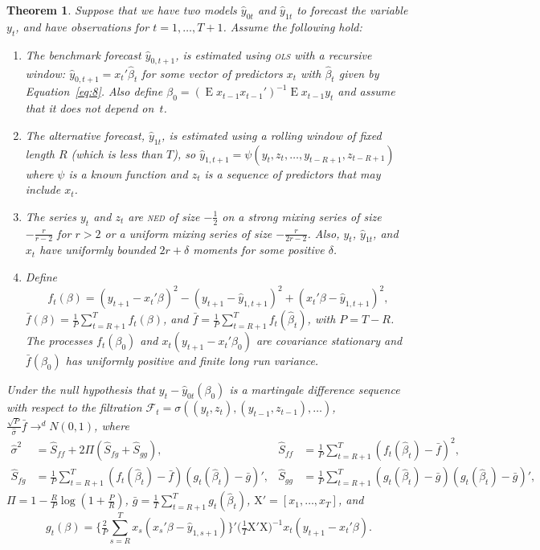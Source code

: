 \documentclass[11pt,fleqn]{article}
\newtheorem{thm}{Theorem}
\theoremstyle{definition}
\DeclareMathOperator{\E}{E}
\newcommand{\X}{\ensuremath{\mathrm{X}}}
\newcommand{\ned}{\textsc{ned}}
\newcommand{\ols}{\textsc{ols}}
\begin{document}
\begin{thm}\label{res:1}
  Suppose that we have two models $\hat{y}_{0t}$ and $\hat{y}_{1t}$ to
  forecast the variable $y_t$, and have observations for
  $t=1,\dots,T+1$.  Assume the following hold:
  \begin{enumerate}
  \item \label{item:1} The benchmark forecast $\hat{y}_{0,t+1}$, is
    estimated using \textsl{\ols} with a recursive window:
    $\hat{y}_{0,t+1} = x_t'\hat{\beta}_t$ for some vector of
    predictors $x_t$ with $\hat{\beta}_t$ given by
    Equation~\eqref{eq:8}.  Also define $\beta_0 = (\E x_{t-1}
    x_{t-1}')^{-1} \E x_{t-1} y_t$ and assume that it does not depend
    on~$t$.
  \item \label{item:2} The alternative forecast, $\hat{y}_{1t}$, is
    estimated using a rolling window of fixed length $R$ (which is
    less than $T$), so $\hat{y}_{1,t+1} =
    \psi(y_t,z_t,\dots,y_{t-R+1}, z_{t-R+1})$ where $\psi$ is a known
    function and $z_t$ is a sequence of predictors that may include
    $x_t$.
  \item \label{item:3} The series $y_t$ and $z_t$ are \textsl{\ned} of size
    $-\frac12$ on a strong mixing series of size $-\frac{r}{r-2}$ for $r>2$ or a
    uniform mixing series of size $-\frac{r}{2r-2}$.  Also, $y_t$,
    $\hat{y}_{1t}$, and $x_t$ have uniformly bounded $2 r+\delta$
    moments for some positive $\delta$.
  \item \label{item:4} Define \[f_t(\beta) = (y_{t+1} - x_t'\beta)^2 -
    (y_{t+1} - \hat{y}_{1,t+1})^2 + (x_t'\beta - \hat{y}_{1,t+1})^2,\]
    $\bar{f}(\beta) = \tfrac1P \sum_{t=R+1}^T f_t(\beta)$, and $\bar f
    = \tfrac1P \sum_{t=R+1}^{T} f_t(\hat{\beta}_t)$, with $P = T -
    R$. The processes $f_t(\beta_0)$ and $x_t(y_{t+1} - x_t'\beta_0)$
    are covariance stationary and $\bar f(\beta_0)$ has uniformly
    positive and finite long run variance.
  \end{enumerate}
  Under the null hypothesis that $y_t - \hat{y}_{0t}(\beta_0)$ is a
  martingale difference sequence with respect to the filtration
  $\mathcal{F}_t = \sigma((y_t, z_{t}), (y_{t-1}, z_{t-1}),\dots)$,
  $\tfrac{\sqrt{P}}{\hat\sigma} \bar f \to^d N(0,1)$, where 
  \begin{align*}
    \hat{\sigma}^2 &= \hat{S}_{ff} + 2 \Pi (\hat{S}_{fg} + \hat{S}_{gg}), &
    \hat{S}_{ff} &= \tfrac1P \sum_{t=R+1}^T (f_t(\hat{\beta}_t) - \bar
    f)^2, \\
    \hat{S}_{fg} &= \tfrac1P \sum_{t=R+1}^T (f_t(\hat{\beta}_t) -
    \bar{f})(g_t(\hat{\beta}_t) - \bar g)', &
    \hat{S}_{gg} &= \tfrac1P \sum_{t=R+1}^T (g_t(\hat{\beta}_t) - \bar
    g)(g_t(\hat{\beta}_t) - \bar g)',
  \end{align*}
  $\Pi = 1 - \tfrac{R}{P} \log(1 + \tfrac{P}{R})$, $\bar{g} = \tfrac1T
  \sum_{t=R+1}^T g_t(\hat{\beta}_t)$, $\X' = [x_1,\dots,x_T]$, and
  \begin{equation*}
    g_t(\beta) =
    \Big\{\tfrac{2}{P}\sum_{s=R}^T x_s (x_s'\beta - \hat{y}_{1,s+1}) \Big\}'
    \big(\tfrac1T \X'\X \big)^{-1} x_t(y_{t+1} - x_t'\beta).
  \end{equation*}
\end{thm}
\end{document}
